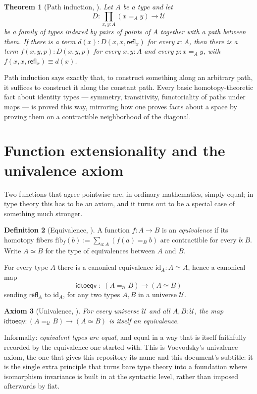 \documentclass[11pt]{amsart}
\theoremstyle{plain}
\newtheorem{theorem}{Theorem}[section]
\newtheorem{axiom}[theorem]{Axiom}
\theoremstyle{definition}
\newtheorem{definition}[theorem]{Definition}
\theoremstyle{remark}
\newcommand{\Uni}{\mathcal{U}}
\newcommand{\refl}{\mathsf{refl}}
\begin{document}
\begin{theorem}[Path induction, {\cite[\S 1.12]{HoTTBook}}]\label{thm:path-induction}
  Let $A$ be a type and let
  \[
    D : \prod_{x,y:A} (x=_A y) \to \Uni
  \]
  be a family of types indexed by pairs of points of $A$ together with a
  path between them. If there is a term $d(x) : D(x,x,\refl_x)$ for
  every $x:A$, then there is a term $f(x,y,p):D(x,y,p)$ for every
  $x,y:A$ and every $p:x=_A y$, with $f(x,x,\refl_x)\equiv d(x)$.
\end{theorem}

Path induction says exactly that, to construct something along an
arbitrary path, it suffices to construct it along the constant path.
Every basic homotopy-theoretic fact about identity types --- symmetry,
transitivity, functoriality of paths under maps --- is proved this way,
mirroring how one proves facts about a space by proving them on a
contractible neighborhood of the diagonal.

\section{Function extensionality and the univalence axiom}\label{sec:univalence}

Two functions that agree pointwise are, in ordinary mathematics, simply
equal; in type theory this has to be an axiom, and it turns out to be a
special case of something much stronger.

\begin{definition}[Equivalence, {\cite[\S 4.1, \S 4.4]{HoTTBook}}]\label{def:equivalence}
  A function $f:A\to B$ is an \emph{equivalence} if its homotopy fibers
  $\mathrm{fib}_f(b) := \sum_{a:A}(f(a)=_B b)$ are contractible for
  every $b:B$. Write $A\simeq B$ for the type of equivalences between
  $A$ and $B$.
\end{definition}

For every type $A$ there is a canonical equivalence $\mathrm{id}_A:A\simeq A$, hence a canonical map
\[
  \mathsf{idtoeqv} \;:\; (A=_{\Uni} B) \longrightarrow (A\simeq B)
\]
sending $\refl_A$ to $\mathrm{id}_A$, for any two types $A,B$ in a
universe $\Uni$.

\begin{axiom}[Univalence, {\cite[\S 2.10]{HoTTBook}}]\label{ax:univalence}
  For every universe $\Uni$ and all $A,B:\Uni$, the map
  $\mathsf{idtoeqv}:(A=_{\Uni}B)\to(A\simeq B)$ is itself an equivalence.
\end{axiom}

Informally: \emph{equivalent types are equal}, and equal in a way that
is itself faithfully recorded by the equivalence one started with. This
is Voevodsky's univalence axiom, the one that gives this repository its
name and this document's subtitle: it is the single extra principle
that turns bare type theory into a foundation where isomorphism
invariance is built in at the syntactic level, rather than imposed
afterwards by fiat.
\end{document}
